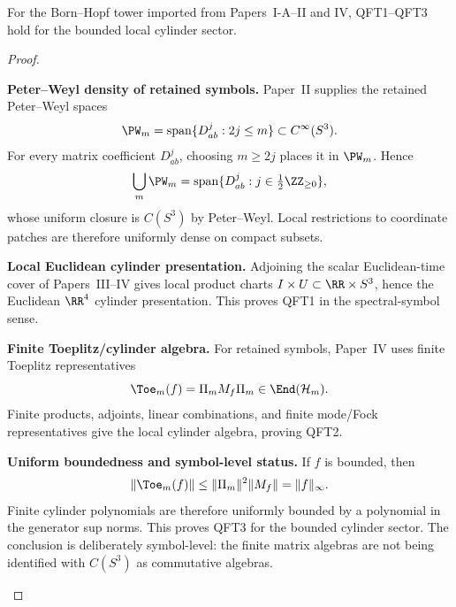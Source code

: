 \documentclass[12pt,a4paper]{article}
\begin{document}
\begin{proposition}
\label{p12:prop:spectral-symbol-qft123}
For the Born--Hopf tower imported from Papers~I-A--II and IV, QFT1--QFT3 hold for the bounded local cylinder sector.
\end{proposition}
\begin{proof}
\begin{proofsteps}
\item \textbf{Peter--Weyl density of retained symbols.}
Paper~II supplies the retained Peter--Weyl spaces
\[
\PW_m=\operatorname{span}\{D^j_{ab}:2j\le m\}\subset C^\infty(S^3).
\]
For every matrix coefficient \(D^j_{ab}\), choosing \(m\ge2j\) places it in \(\PW_m\).  Hence
\[
\bigcup_m\PW_m
=
\operatorname{span}\{D^j_{ab}:j\in\tfrac12\ZZ_{\ge0}\},
\]
whose uniform closure is \(C(S^3)\) by Peter--Weyl.  Local restrictions to coordinate patches are therefore uniformly dense on compact subsets.

\item \textbf{Local Euclidean cylinder presentation.}
Adjoining the scalar Euclidean-time cover of Papers~III--IV gives local product charts \(I\times U\subset\RR\times S^3\), hence the Euclidean \(\RR^4\) cylinder presentation.  This proves QFT1 in the spectral-symbol sense.

\item \textbf{Finite Toeplitz/cylinder algebra.}
For retained symbols, Paper~IV uses finite Toeplitz representatives
\[
\Toe_m(f)=\Pi_mM_f\Pi_m\in\End(\mathcal H_m).
\]
Finite products, adjoints, linear combinations, and finite mode/Fock representatives give the local cylinder algebra, proving QFT2.

\item \textbf{Uniform boundedness and symbol-level status.}
If \(f\) is bounded, then
\[
\|\Toe_m(f)\|\le\|\Pi_m\|^2\|M_f\|=\|f\|_\infty.
\]
Finite cylinder polynomials are therefore uniformly bounded by a polynomial in the generator sup norms.  This proves QFT3 for the bounded cylinder sector.  The conclusion is deliberately symbol-level: the finite matrix algebras are not being identified with \(C(S^3)\) as commutative algebras.
\end{proofsteps}
\end{proof}
\end{document}
